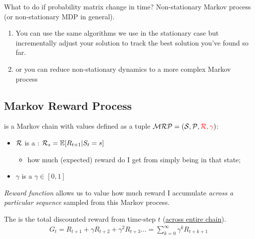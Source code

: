 \begin{notebox}
What to do if probability matrix change in time? Non-stationary Markov process (or non-stationary MDP in general).


\begin{enumerate}
	\item  You can use the same algorithms we use in the stationary case but incrementally adjust your solution to track the best solution you've found so far.
	\item or you can reduce non-stationary dynamics to a more complex Markov process 
\end{enumerate}
\end{notebox}


\subsection{Markov Reward Process}
\label{sec:MRP}
 is a Markov chain with values defined as a tuple $\mathcal{MRP} = (\mathcal{S}, \mathcal{P}, \textcolor{red}{\mathcal{R}, \gamma})$:
\begin{itemize}
	\item $\mathcal{R}$ is a : $\mathcal{R}_s = \operatorname{\mathbb{E}}[R_{t+1} | S_t = s]$
	\begin{itemize}
		\item how much (expected) reward do I get from simply being in that state;
	\end{itemize}
	\item $\gamma$ is a  $\gamma \in [0, 1]$
\end{itemize}
\emph{Reward function} allows us to value how much reward I accumulate \textit{across a particular sequence} sampled from this Markov process.


The  is the total discounted reward from time-step $t$ (\underline{across entire chain}).
\begin{align}
	G_t = R_{t+1}+ \gamma R_{t+2} + \gamma^2 R_{t+3} ... = \sum_{k=0}^{\infty} \gamma^k R_{t+k+1}
\end{align}

